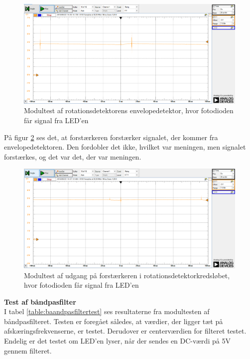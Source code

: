 \begin{figure}[H]
	\centering
	\includegraphics[width=\textwidth]{Test/images/AffyringTest/KanSe/envelopedetektor}
	\caption{Modultest af rotationsdetektorens envelopedetektor, hvor fotodioden får signal fra LED'en}
	\label{fig:envdetKanSe}
\end{figure}

På figur \ref{fig:forstaerkerudgangKanSe} ses det, at forstærkeren forstærker signalet, der kommer fra envelopedetektoren. Den fordobler det ikke, hvilket var meningen, men signalet forstærkes, og det var det, der var meningen. 

\begin{figure}[H]
	\centering
	\includegraphics[width=\textwidth]{Test/images/AffyringTest/KanSe/forstaerkerudgang}
	\caption{Modultest af udgang på forstærkeren i rotationsdetektorkredsløbet, hvor fotodioden får signal fra LED'en}
	\label{fig:forstaerkerudgangKanSe}
\end{figure}

\noindent \textbf{Test af båndpasfilter} \\
\noindent I tabel \ref{table:baandpasfiltertest} ses resultaterne fra modultesten af båndpasfilteret. Testen er foregået således, at værdier, der ligger tæt på afskæringsfrekvenserne, er testet. Derudover er centerværdien for filteret testet. Endelig er det testet om LED'en lyser, når der sendes en DC-værdi på 5V gennem filteret. 

